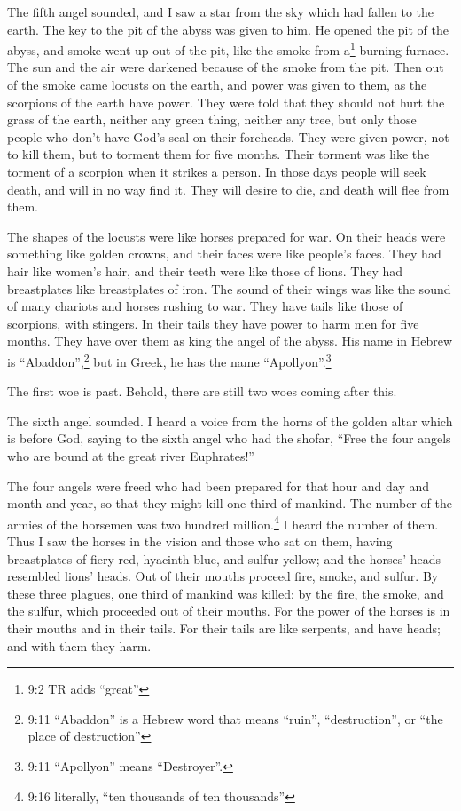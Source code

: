 \mychapter{} \myverse*{}The fifth angel sounded, and I saw a star from the sky which had
fallen to the earth. The key to the pit of the abyss was given to him.
\myverse{}He opened the pit of the abyss, and smoke went up out of the pit, like the smoke
from a\footnote{9:2 TR adds “great”} burning furnace. The sun and the air were darkened because of the smoke
from the pit.
\myverse{}Then out of the smoke came locusts on the earth, and power was given to them,
as the scorpions of the earth have power.
\myverse{}They were told that they should not hurt the grass of the earth, neither any
green thing, neither any tree, but only those people who don’t have God’s seal on their foreheads.
\myverse{}They were given power, not to kill them, but to torment them for five months.
Their torment was like the torment of a scorpion when it strikes a person.
\myverse{}In those days people will seek death, and will in no way find it. They will
desire to die, and death will flee from them.

\myverse{}The shapes of the locusts were like horses prepared for war. On
their heads were something like golden crowns, and their faces were like people’s faces.
\myverse{}They had hair like women’s hair, and their teeth were like those of lions.
\myverse{}They had breastplates like breastplates of iron. The sound of their wings was
like the sound of many chariots and horses rushing to war.
\myverse{}They have tails like those of scorpions, with stingers. In their tails they
have power to harm men for five months.
\myverse{}They have over them as king the angel of the abyss. His name in Hebrew is
“Abaddon”,\footnote{9:11 “Abaddon” is a Hebrew word that means “ruin”, “destruction”, or “the place of destruction”}
but in Greek, he has the name “Apollyon”.\footnote{9:11 “Apollyon” means “Destroyer”.}

\myverse{}The first woe is past. Behold, there are still two woes coming
after this.

\myverse{}The sixth angel sounded. I heard a voice from the horns of the
golden altar which is before God,
\myverse{}saying to the sixth angel who had the shofar, “Free the four angels who are
bound at the great river Euphrates!”

\myverse{}The four angels were freed who had been prepared for that hour
and day and month and year, so that they might kill one third of mankind.
\myverse{}The number of the armies of the horsemen was two hundred million.\footnote{9:16 literally, “ten thousands of ten thousands”} I heard the number of them.
\myverse{}Thus I saw the horses in the vision and those who sat on them, having breastplates
of fiery red, hyacinth blue, and sulfur yellow; and the horses’ heads resembled lions’ heads. Out of their
mouths proceed fire, smoke, and sulfur.
\myverse{}By these three plagues, one third of mankind was killed: by the fire, the
smoke, and the sulfur, which proceeded out of their mouths.
\myverse{}For the power of the horses is in their mouths and in their tails. For their
tails are like serpents, and have heads; and with them they harm.

